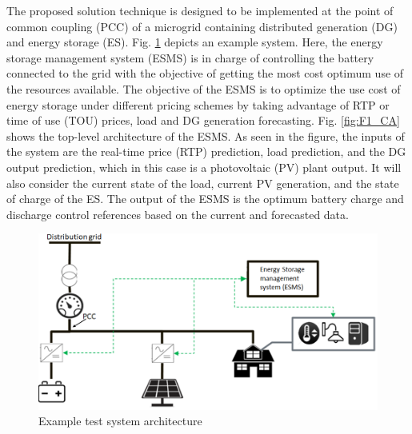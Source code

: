 The proposed solution technique is designed to be implemented at the point of common coupling (PCC) of a microgrid containing distributed generation (DG) and energy storage (ES). Fig. \ref{fig:system_arch} depicts an example system. Here, the energy storage management system (ESMS) is in charge of controlling the battery connected to the grid with the objective of getting the most cost optimum use of the resources available. The objective of the ESMS is to optimize the use cost of energy storage under different pricing schemes by taking advantage of RTP or time of use (TOU) prices, load and DG generation forecasting.  Fig. \ref{fig:F1_CA} shows the top-level architecture of the ESMS. As seen in the figure, the inputs of the system are the real-time price (RTP) prediction, load prediction, and the DG output prediction, which in this case is a photovoltaic (PV) plant output. It will also consider the current state of the load, current PV generation, and the state of charge of the ES. The output of the ESMS is the optimum battery charge and discharge control references based on the current and forecasted data.

\begin{figure}[!htbp]
\centering
\includegraphics[width=\linewidth]{figs/A8/System_architecture.png}
\caption{Example test system architecture}
\label{fig:system_arch}
\vspace{-3mm}
\end{figure}


